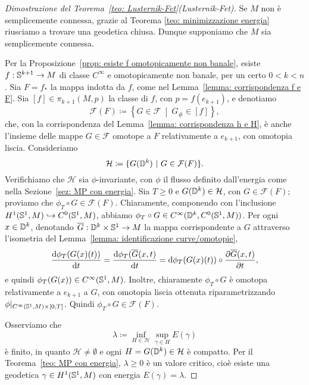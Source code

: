 \begin{proof}[Dimostrazione del Teorema~\ref{teo: Lusternik-Fet}(Lusternik-Fet)]
	Se \(M\) non è semplicemente connessa, grazie al Teorema \ref{teo: minimizzazione energia} riusciamo a trovare una geodetica chiusa. Dunque supponiamo che \(M\) sia semplicemente connessa. 
	
	Per la Proposizione~\ref{prop: esiste f omotopicamente non banale}, esiste  \(f:\mathbb{S}^{k+1} \to M\) di classe \(C^\infty\) e omotopicamente non banale, per un certo \(0<k<n\). Sia \(F=f_*\) la mappa indotta da \(f\), come nel Lemma~\ref{lemma: corrispondenza f e F}. Sia \([f] \in \pi_{k+1}(M,p)\) la classe di \(f\), con \(p = f(e_{k+1})\), e denotiamo
	\[
	\mathcal{F}(F) \coloneq \left\{ G \in \mathcal{F} \ \middle| \ G_\# \in [f] \right\},
	\]
	che, con la corrispondenza del Lemma~\ref{lemma: corrispondenza h e H}, è anche l'insieme delle mappe \(G \in \mathcal{F}\) omotope a \(F\) relativamente a \(e_{k+1}\), con omotopia liscia.
	Consideriamo
	\[
	\mathcal{H} \coloneq \{G(\mathbb{D}^k) \ | \ G \in \mathcal{F}(F)\}.
	\]
	Verifichiamo che \(\mathcal{H}\) sia \(\phi\)-invariante, con \(\phi\) il flusso definito dall'energia come nella Sezione~\ref{sez: MP con energia}. Sia \(T\geq 0\) e \(G(\mathbb{D}^k) \in \mathcal{H}\), con \(G \in \mathcal{F}(F)\); proviamo che \(\phi_T \circ G \in \mathcal{F}(F)\). Chiaramente, componendo con l'inclusione \(H^1(\mathbb{S}^1,M) \hookrightarrow C^0(\mathbb{S}^1,M)\), abbiamo \(\phi_T \circ G \in C^\infty(\mathbb{D}^k,C^0(\mathbb{S}^1,M))\). Per ogni \(x \in \mathbb{D}^k\), denotando \(\overline{G}: \mathbb{D}^k \times \mathbb{S}^1 \to M\) la mappa corrispondente a \(G\) attraverso l'isometria del Lemma~\ref{lemma: identificazione curve/omotopie},
	\[
		\frac{\mathrm{d} \phi_T(G(x)(t))}{\mathrm{d} t} = \frac{\mathrm{d} \phi_T(\overline{G}(x,t)}{\mathrm{d} t} = \mathrm{d} \phi_T(G(x)(t)) \circ \frac{\partial \overline{G}(x,t)}{\partial t},
	\]
	e quindi \(\phi_T(G(x)) \in C^\infty(\mathbb{S}^1,M)\). Inoltre, chiaramente \(\phi_T \circ G\) è omotopa relativamente a \(e_{k+1}\) a \(G\), con omotopia liscia ottenuta riparametrizzando \(\phi|_{C^\infty(\mathbb{S}^1,M) \times [0,T]}\). Quindi \(\phi_T \circ G \in \mathcal{F}(F)\). 
	
	Osserviamo che
	\[
		\lambda \coloneq \inf_{H \in \mathcal{H}} \sup_{\gamma \in H} E(\gamma)
	\]
	è finito, in quanto \(\mathcal{H} \neq \emptyset\) e ogni \(H = G(\mathbb{D}^k) \in \mathcal{H}\) è compatto.
	Per il Teorema~\ref{teo: MP con energia}, \(\lambda \geq 0\) è un valore critico, cioè esiste una geodetica \(\gamma \in H^1(\mathbb{S}^1,M)\) con energia \(E(\gamma)=\lambda\). 
	

\end{proof}
